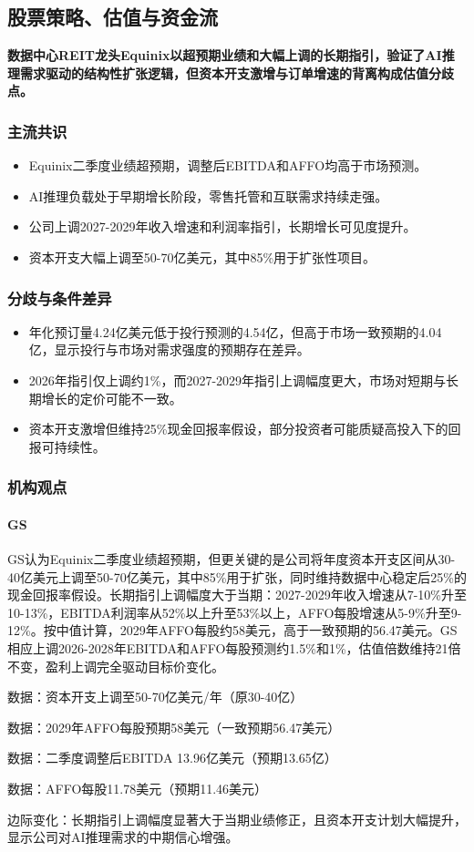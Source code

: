 \documentclass[11pt]{ctexart}
\begin{document}
\subsection{股票策略、估值与资金流}
\textbf{数据中心REIT龙头Equinix以超预期业绩和大幅上调的长期指引，验证了AI推理需求驱动的结构性扩张逻辑，但资本开支激增与订单增速的背离构成估值分歧点。}
\subsubsection*{主流共识}
\begin{itemize}
  \item Equinix二季度业绩超预期，调整后EBITDA和AFFO均高于市场预测。
  \item AI推理负载处于早期增长阶段，零售托管和互联需求持续走强。
  \item 公司上调2027-2029年收入增速和利润率指引，长期增长可见度提升。
  \item 资本开支大幅上调至50-70亿美元，其中85\%用于扩张性项目。
\end{itemize}
\subsubsection*{分歧与条件差异}
\begin{itemize}
  \item 年化预订量4.24亿美元低于投行预测的4.54亿，但高于市场一致预期的4.04亿，显示投行与市场对需求强度的预期存在差异。
  \item 2026年指引仅上调约1\%，而2027-2029年指引上调幅度更大，市场对短期与长期增长的定价可能不一致。
  \item 资本开支激增但维持25\%现金回报率假设，部分投资者可能质疑高投入下的回报可持续性。
\end{itemize}
\subsubsection*{机构观点}
\paragraph{GS} GS认为Equinix二季度业绩超预期，但更关键的是公司将年度资本开支区间从30-40亿美元上调至50-70亿美元，其中85\%用于扩张，同时维持数据中心稳定后25\%的现金回报率假设。长期指引上调幅度大于当期：2027-2029年收入增速从7-10\%升至10-13\%，EBITDA利润率从52\%以上升至53\%以上，AFFO每股增速从5-9\%升至9-12\%。按中值计算，2029年AFFO每股约58美元，高于一致预期的56.47美元。GS相应上调2026-2028年EBITDA和AFFO每股预测约1.5\%和1\%，估值倍数维持21倍不变，盈利上调完全驱动目标价变化。
{\small\color{refgray}数据：资本开支上调至50-70亿美元/年（原30-40亿）\par}
{\small\color{refgray}数据：2029年AFFO每股预期58美元（一致预期56.47美元）\par}
{\small\color{refgray}数据：二季度调整后EBITDA 13.96亿美元（预期13.65亿）\par}
{\small\color{refgray}数据：AFFO每股11.78美元（预期11.46美元）\par}
{\small\color{refgray}边际变化：长期指引上调幅度显著大于当期业绩修正，且资本开支计划大幅提升，显示公司对AI推理需求的中期信心增强。\par}
\end{document}
